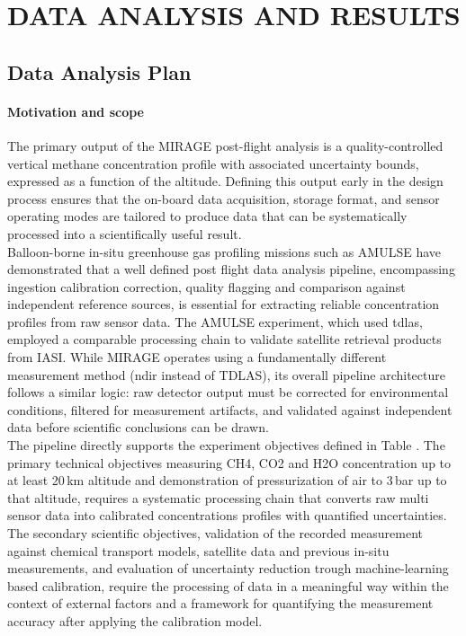 \chapter{DATA ANALYSIS AND RESULTS}
\label{sec:data_analysis_results}

\section{Data Analysis Plan}

\subsubsection*{Motivation and scope}

The primary output of the MIRAGE post-flight analysis is a quality-controlled vertical methane concentration profile with associated uncertainty bounds, expressed as a function of the altitude. Defining this output early in the design process ensures that the on-board data acquisition, storage format, and sensor operating modes are tailored to produce data that can be systematically processed into a scientifically useful result.\\
Balloon-borne in-situ greenhouse gas profiling missions such as AMULSE \cite{Khair2017} have demonstrated that a well defined post flight data analysis pipeline, encompassing ingestion calibration correction, quality flagging and comparison against independent reference sources, is essential for extracting reliable concentration profiles from raw sensor data. The AMULSE experiment, which used \gls{tdlas}, employed a comparable processing chain to validate satellite retrieval products from IASI. While MIRAGE operates using a fundamentally different measurement method (\gls{ndir} instead of TDLAS), its overall pipeline architecture follows a similar logic: raw detector output must be corrected for environmental conditions, filtered for measurement artifacts, and validated against independent data before scientific conclusions can be drawn.\\
The pipeline directly supports the experiment objectives defined in Table . The primary technical objectives measuring CH4, CO2 and H2O concentration up to at least 20\,km altitude and demonstration of pressurization of air to 3\,bar up to that altitude, requires a systematic processing chain that converts raw multi sensor data into calibrated concentrations profiles with quantified uncertainties. The secondary scientific objectives, validation of the recorded measurement against chemical transport models, satellite data and previous in-situ measurements, and evaluation of uncertainty reduction trough machine-learning based calibration, require the processing of data in a meaningful way within the context of external factors and a framework for quantifying the measurement accuracy after applying the calibration model.


